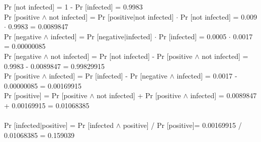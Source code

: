 \documentclass[12pt,a4paper]{article}
\begin{document}
 \noindent Pr [not infected] = 1 - Pr [infected] = 0.9983 \\
 Pr [positive \(\land\) not infected] = Pr [positive\(\vert\)not infected] \(\cdot\) Pr [not infected] = 0.009 \(\cdot\) 0.9983 = 0.0089847 \\
 Pr [negative \(\land\) infected] = Pr [negative\(\vert\)infected] \(\cdot\) Pr [infected] = 0.0005 \(\cdot \) 0.0017 = 0.00000085 \\
 Pr [negative \(\land\) not infected] = Pr [not infected] - Pr [positive \(\land\) not infected] = 0.9983 - 0.0089847 = 0.99829915 \\
 Pr [positive \(\land\) infected] = Pr [infected] - Pr [negative \(\land\) infected] = 0.0017 -  0.00000085 = 0.00169915 \\
 Pr [positive] = Pr [positive \(\land\) not infected] + Pr [positive \(\land\) infected] =  0.0089847 + 0.00169915 = 0.01068385\\
 \\
 Pr [infected\(\vert\)positive]  = 
 Pr [infected \(\land \) positive] / Pr [positive]= 0.00169915 / 0.01068385 = 0.159039
\end{document}
